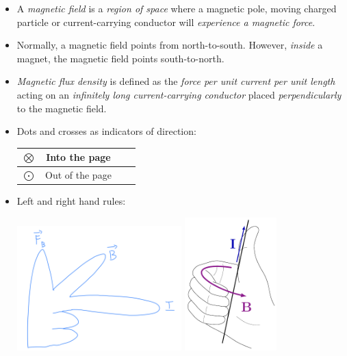 \documentclass[oneside]{book}
\begin{document}
\begin{itemize}
    \item A \emph{magnetic field} is a \emph{region of space} where a magnetic pole, moving charged particle or current-carrying conductor will \emph{experience a magnetic force}.
    \item Normally, a magnetic field points from north-to-south. However, \emph{inside} a magnet, the magnetic field points south-to-north. 
    \item \emph{Magnetic flux density} is defined as the \emph{force per unit current per unit length} acting on an \emph{infinitely long current-carrying conductor} placed \emph{perpendicularly} to the magnetic field.
    \item Dots and crosses as indicators of direction:
    \begin{center}
        \begin{tabular}{|Sc|Sc|}
            \hline
            \Large \(\bigotimes\) & Into the page\\
            \hline
            \Large \(\bigodot\) & Out of the page\\
            \hline
        \end{tabular}
    \end{center}
    \newpage
    \item Left and right hand rules:
    \begin{center}
        \includegraphics[width=0.5\textwidth]{../images/Left-Right-Hand-Rules/Left-hand-rule.png}
        \hspace{2cm}
        \includegraphics[width=0.28\textwidth]{../images/Left-Right-Hand-Rules/Right-hand-rule.pdf}

\end{center}
\end{itemize}
\end{document}
